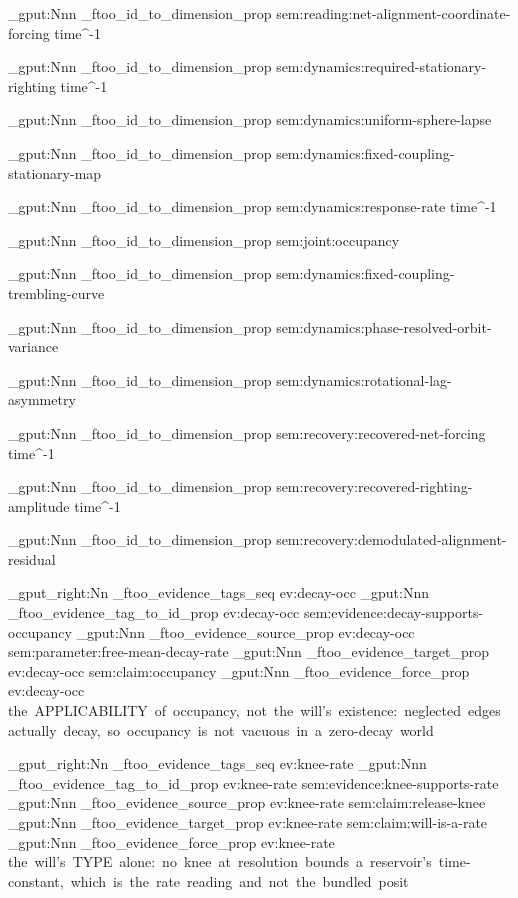 \prop_gput:Nnn \g_ftoo_id_to_dimension_prop { sem:reading:net-alignment-coordinate-forcing } { time^-1 }

\prop_gput:Nnn \g_ftoo_id_to_dimension_prop { sem:dynamics:required-stationary-righting } { time^-1 }

\prop_gput:Nnn \g_ftoo_id_to_dimension_prop { sem:dynamics:uniform-sphere-lapse } {  }

\prop_gput:Nnn \g_ftoo_id_to_dimension_prop { sem:dynamics:fixed-coupling-stationary-map } {  }

\prop_gput:Nnn \g_ftoo_id_to_dimension_prop { sem:dynamics:response-rate } { time^-1 }

\prop_gput:Nnn \g_ftoo_id_to_dimension_prop { sem:joint:occupancy } {  }

\prop_gput:Nnn \g_ftoo_id_to_dimension_prop { sem:dynamics:fixed-coupling-trembling-curve } {  }

\prop_gput:Nnn \g_ftoo_id_to_dimension_prop { sem:dynamics:phase-resolved-orbit-variance } {  }

\prop_gput:Nnn \g_ftoo_id_to_dimension_prop { sem:dynamics:rotational-lag-asymmetry } {  }

\prop_gput:Nnn \g_ftoo_id_to_dimension_prop { sem:recovery:recovered-net-forcing } { time^-1 }

\prop_gput:Nnn \g_ftoo_id_to_dimension_prop { sem:recovery:recovered-righting-amplitude } { time^-1 }

\prop_gput:Nnn \g_ftoo_id_to_dimension_prop { sem:recovery:demodulated-alignment-residual } {  }



\seq_gput_right:Nn \g_ftoo_evidence_tags_seq { ev:decay-occ }
\prop_gput:Nnn \g_ftoo_evidence_tag_to_id_prop { ev:decay-occ } { sem:evidence:decay-supports-occupancy }
\prop_gput:Nnn \g_ftoo_evidence_source_prop { ev:decay-occ } { sem:parameter:free-mean-decay-rate }
\prop_gput:Nnn \g_ftoo_evidence_target_prop { ev:decay-occ } { sem:claim:occupancy }
\prop_gput:Nnn \g_ftoo_evidence_force_prop { ev:decay-occ } { the~APPLICABILITY~of~occupancy,~not~the~will's~existence:~neglected~edges~actually~decay,~so~occupancy~is~not~vacuous~in~a~zero-decay~world }

\seq_gput_right:Nn \g_ftoo_evidence_tags_seq { ev:knee-rate }
\prop_gput:Nnn \g_ftoo_evidence_tag_to_id_prop { ev:knee-rate } { sem:evidence:knee-supports-rate }
\prop_gput:Nnn \g_ftoo_evidence_source_prop { ev:knee-rate } { sem:claim:release-knee }
\prop_gput:Nnn \g_ftoo_evidence_target_prop { ev:knee-rate } { sem:claim:will-is-a-rate }
\prop_gput:Nnn \g_ftoo_evidence_force_prop { ev:knee-rate } { the~will's~TYPE~alone:~no~knee~at~resolution~bounds~a~reservoir's~time-constant,~which~is~the~rate~reading~and~not~the~bundled~posit }

